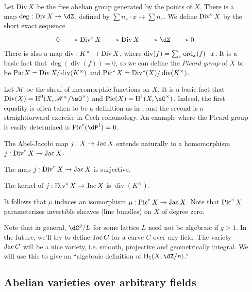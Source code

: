 Let $\operatorname{Div} X$ be the free abelian group generated by the points of $X$. There 
is a map $\deg:\divisor X\to \dZ$, defined by 
$\sum n_x\cdot x\mapsto \sum n_x$. We define $\operatorname{Div}^\circ X$ by the short exact 
sequence 
\[\xymatrix{
  0 \ar[r]
    & \divisor^\circ X \ar[r]
    & \divisor X \ar[r]
    & \dZ \ar[r]
    & 0 \text{.}
}\]
There is also a map $\operatorname{div}:K^\times\to \operatorname{Div} X$, where 
$\operatorname{div}(f) = \sum_x \operatorname{ord}_x(f)\cdot x$. It is a basic fact that 
$\deg(\operatorname{div}(f)) = 0$, so we can define the \emph{Picard group} 
of $X$ to be $\operatorname{Pic} X = \operatorname{Div} X/\operatorname{div}(K^\times)$ and 
$\operatorname{Pic}^\circ X = \operatorname{Div}^\circ (X)/\operatorname{div}(K^\times)$. 

Let $\mathscr{M}$ be the sheaf of meromorphic functions on $X$. It is a basic 
fact that $\divisor(X)=\h^0(X,\mathscr{M}^\times/\sO^\times)$ and 
$\picard(X)=\h^1(X,\sO^\times)$. Indeed, the first equality is often taken to 
be a definition as in \cite[III.6]{ha77}, and the second is a straightforward 
exercise in \v Cech cohomology. 
An example where the Picard group is easily 
determined is $\picard^\circ(\dP^1) = 0$.

The Abel-Jacobi map $j:X\to \operatorname{Jac} X$ extends naturally to a homomorphism  
$j:\operatorname{Div}^\circ X\to \operatorname{Jac} X$. 

\begin{theorem}[Jacobi]
The map $j:\operatorname{Div}^\circ X\to\operatorname{Jac} X$ is surjective.
\end{theorem}

\begin{theorem}[Abel]
The kernel of $j:\operatorname{Div}^\circ X\to \operatorname{Jac} X$ is $\operatorname{div}(K^\times)$. 
\end{theorem}

It follows that $\mu$ induces an isomorphism $\mu:\operatorname{Pic}^\circ X\to \operatorname{Jac} X$. 
Note that $\operatorname{Pic}^\circ X$ parameterizes invertible sheaves (line bundles) on 
$X$ of degree zero. 

Note that in general, $\dC^g/L$ for some lattice $L$ need not be 
algebraic if $g>1$. In the future, we'll try to define $\operatorname{Jac} C$ for a curve 
$C$ over any field. The variety $\operatorname{Jac} C$ will be a nice variety, i.e. 
smooth, projective and geometrically integral. We will use this to give an 
``algebraic definition of $\h_1(X,\dZ/n)$.'' 





\subsection{Abelian varieties over arbitrary fields}


